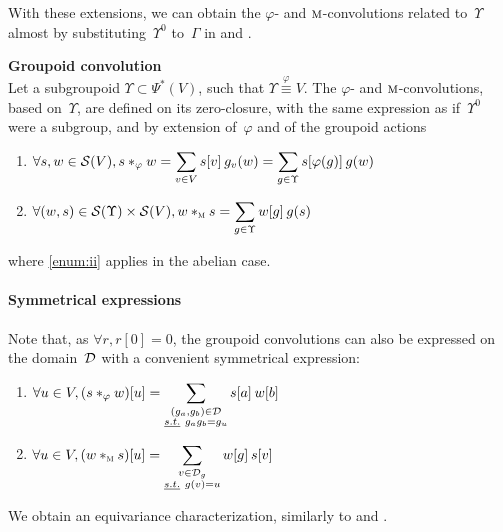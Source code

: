 With these extensions, we can obtain the $\varphi$- and $\M$-convolutions related to~$\Upsilon$ almost by substituting~$\Upsilon^0$ to~$\Gamma$ in  and .

\begin{definition}\textbf{Groupoid convolution}\\
Let a subgroupoid $\Upsilon \subset \Psi^*(V)$, such that $\Upsilon \overset\varphi\equiv V$. The $\varphi$- and $\M$-convolutions, based on~$\Upsilon$, are defined on its zero-closure, with the same expression as if~$\Upsilon^0$ were a subgroup, and by extension of~$\varphi$ and of the groupoid actions \ie
\begin{enumerate}[label=(\roman*)]
  \item $\forall s, w \in \cs(V),
  			s \ast_\varphi w = \displaystyle\sum_{v \in V} s[v] \h{2} g_v(w) = \displaystyle\sum_{g \in \Upsilon} s[\varphi(g)] \h{2} g(w)$ \label{enum:i}
  \item $\forall (w,s) \in \cs(\Upsilon) \times \cs(V), w \ast_{\M} s  = \displaystyle\sum_{g \in \Upsilon} w[g] \h{2} g(s)$ \label{enum:ii}
\end{enumerate}
where \ref{enum:ii} applies in the abelian case.
\end{definition}

\paragraph{Symmetrical expressions}
Note that, as $\forall r, r[0] = 0$, the groupoid convolutions can also be expressed on the domain~$\cd$ with a convenient symmetrical expression:
\begin{enumerate}[label=(\roman*)]
  \item $\forall u \in V, (s \ast_\varphi w)[u] =  \displaystyle\sum_{\substack{(g_a,g_b) \in \cd\\ \st g_ag_b = g_u}} s[a] \h{2} w[b]$
  \item $\forall u \in V, (w \ast_{\M} s)[u]  = \displaystyle\sum_{\substack{v \in \cd_g\\ \st g(v) = u}} w[g] \h{2} s[v]$
\end{enumerate}

We obtain an equivariance characterization, similarly to  and .

